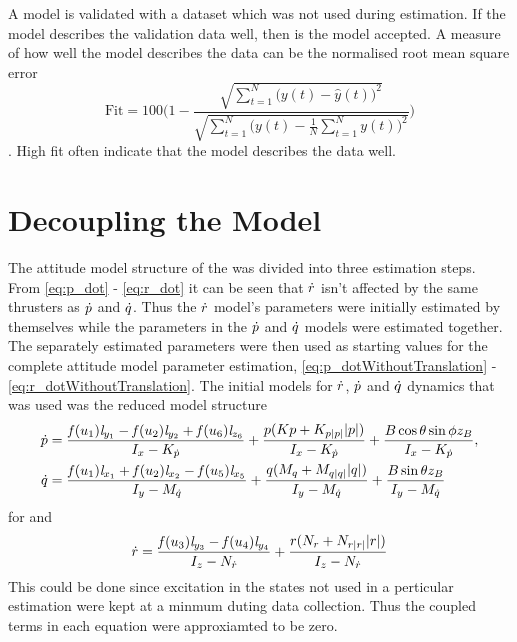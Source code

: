 A model is validated with a dataset which was not used during estimation. If the model describes the validation data well, then is the model accepted. A measure of how well the model describes the data can be the normalised root mean square error
\begin{equation}
\text{Fit} = 100 \Biggr(1 - \frac{\sqrt{\sum\limits_{t=1}^N \bigr(y(t) - \hat{y}(t)\bigl)^2}}{\sqrt{\sum\limits_{t=1}^N \bigr(y(t)-\frac{1}{N}\sum\limits_{t=1}^N y(t)\bigl)^2}}\Biggl)
\end{equation}. 
High fit often indicate that the model describes the data well. 
\section{Decoupling the Model} 
The attitude model structure of the \abbrROV was divided into three estimation steps. From \eqref{eq:p_dot} - \eqref{eq:r_dot} it can be seen that $\dot{r}$ isn't affected by the same thrusters as $\dot{p}$ and $\dot{q}$. Thus the $\dot{r}$ model's parameters were initially estimated by themselves while the parameters in the $\dot{p}$ and $\dot{q}$ models were estimated together. The separately estimated parameters were then used as starting values for the complete attitude model parameter estimation, \eqref{eq:p_dotWithoutTranslation} - \eqref{eq:r_dotWithoutTranslation}. The initial models for $\dot{r}$, $\dot{p}$ and $\dot{q}$ dynamics that was used was the reduced model structure
\begin{align} \label{eq:pq_dot_simple}
\dot{p} &= \frac{\mathit{f}(u_{1}) \mathit{l}_{y_{1}} - \mathit{f}(u_{2}) \mathit{l}_{y_{2}} + \mathit{f}(u_{6}) \mathit{l}_{z_{6}}}{I_{x} - K_{\dot{p}}} + \frac{p (Kp + K_{p|p|} |p|)}{I_{x} - K_{\dot{p}}} + \frac{B \cos{\theta} \sin{\phi} z_B}{I_{x} - K_{\dot{p}}}, \\ \label{eq:pq_dot_simple2}
\dot{q} &=\frac{\mathit{f}(u_{1}) \mathit{l}_{x_{1}} + \mathit{f}(u_{2}) \mathit{l}_{x_{2}} - \mathit{f}(u_{5}) \mathit{l}_{x_{5}}}{I_{y} - M_{\dot{q}}} + \frac{q (M_{q} + M_{q|q|} |q|)}{I_{y} - M_{\dot{q}}} + \frac{B \sin{\theta} z_B}{I_{y} - M_{\dot{q}}} 
\end{align} for and
\begin{equation} \label{eq:r_dot_simple}
\dot{r} = \frac{\mathit{f}(u_{3}) \mathit{l}_{y_{3}} - \mathit{f}(u_{4}) \mathit{l}_{y_{4}}}{I_{z} - N_{\dot{r}}} + \frac{r (N_{r} + N_{r|r|} |r|)}{I_{z} - N_{\dot{r}}}
\end{equation}
This could be done since excitation in the states not used in a perticular estimation were kept at a minmum duting data collection. Thus the coupled terms in each equation were approxiamted to be zero.


